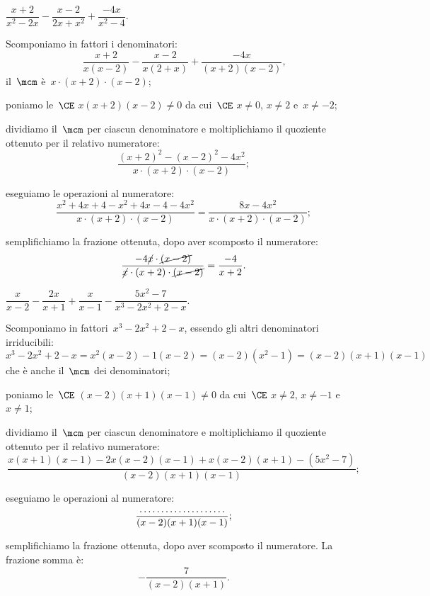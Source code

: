 \begin{exrig}
 \begin{esempio}
$\dfrac{x+2}{x^{2}-2x}-\dfrac{x-2}{2x+x^{2}}+\dfrac{-4x}{x^{2}-4}$.
\begin{itemize*}
 \item Scomponiamo in fattori i denominatori:
 \[\frac{x+2}{x(x-2)}-\frac{x-2}{x(2+x)}+\frac{-4x}{(x+2)(x-2)}\text{,}\]
    il~$\mcm$ è~$x\cdot (x+2)\cdot (x-2)$;
 \item poniamo le~$\CE$ $x(x+2)(x-2) \neq 0$ da cui~$\CE$ $x \neq 0$, $x \neq 2$ e~$ x \neq -2$;
 \item dividiamo il~$\mcm$ per ciascun denominatore e moltiplichiamo il quoziente ottenuto per il relativo numeratore:
    \[\frac{(x+2)^{2}-(x-2)^{2}-4x^{2}}{x\cdot(x+2)\cdot(x-2)};\]
 \item eseguiamo le operazioni al numeratore:
    \begin{equation*}
     \frac{x^{2}+4x+4-x^{2}+4x-4-4x^{2}}{x\cdot(x+2)\cdot(x-2)}=\frac{8x-4x^{2}}{x\cdot(x+2)\cdot(x-2)};
     \end{equation*}
 \item semplifichiamo la frazione ottenuta, dopo aver scomposto il numeratore:
    \begin{equation*}
    \frac{-4\cancel{x}\cdot\cancel{(x-2)}}{\cancel{x}\cdot(x+2)\cdot\cancel{(x-2)}}=\frac{-4}{x+2}.
    \end{equation*}
\end{itemize*}
 \end{esempio}

 \begin{esempio}
$\dfrac{x}{x-2}-\dfrac{2x}{x+1}+\dfrac{x}{x-1}-\dfrac{5x^{2}-7}{x^{3}-2x^{2}+2-x}$.
\begin{itemize*}
 \item Scomponiamo in fattori~$x^{3}-2x^{2}+2-x$, essendo gli altri denominatori
 irriducibili:  $x^{3}-2x^{2}+2-x=x^2(x-2)-1(x-2)=(x-2)\left(x^2-1\right)=(x-2)(x+1)(x-1)$ che è anche il~$\mcm$ dei denominatori;
 \item poniamo le~$\CE$ $(x-2)(x+1)(x-1) \neq 0$ da cui~$\CE$ $x \neq 2$, $ x \neq -1$ e~$x \neq 1$;
 \item dividiamo il~$\mcm$ per ciascun denominatore e moltiplichiamo il quoziente ottenuto per il relativo numeratore:
 \[\frac{x(x+1)(x-1)-2x(x-2)(x-1)+x(x-2)(x+1)-(5x^{2}-7)}{(x-2)(x+1)(x-1)};\]
 \item eseguiamo le operazioni al numeratore:
 \[\frac{\dotfill}{(x-2)(x+1)(x-1)};\]
 \item semplifichiamo la frazione ottenuta, dopo aver scomposto il numeratore. La frazione somma è:
 \[-{\frac{7}{(x-2)(x+1)}}.\]
 \end{itemize*}
 \end{esempio}

\end{exrig}

\ovalbox{\risolvii \ref{ese:19.22}, \ref{ese:19.23}, \ref{ese:19.24}, \ref{ese:19.25}, \ref{ese:19.26}, \ref{ese:19.27}, \ref{ese:19.28}, \ref{ese:19.29}, \ref{ese:19.30}}
\newpage


\cleardoublepage
